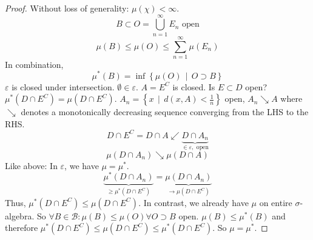 \documentclass[a4paper]{article}
\numberwithin{lecref}{section}
\theoremstyle{break}
\newcommand{\SetDef}[2]{\left\{#1\,\mid\,#2\right\}}
\begin{document}
\begin{proof}
  Without loss of generality: $\mu(\chi) < \infty$.
  \[ B \subset O = \bigcup_{n=1}^\infty E_n \text{ open} \]
  \[ \mu(B) \leq \mu(O) \leq \sum_{n=1}^\infty \mu(E_n) \]
  In combination,
  \[ \mu^*(B) = \inf\SetDef{\mu(O)}{O \supset B} \]
  $\varepsilon$ is closed under intersection. $\emptyset \in \varepsilon$.
  $A = E^C$ is closed. Is $E \subset D$ open? $\mu^*(D \cap E^C) = \mu(D \cap E^C)$.
  $A_n = \SetDef{x}{d(x, A) < \frac1n}$ open, $A_n \searrow A$
  where $\searrow$ denotes a monotonically decreasing sequence converging from the LHS to the RHS.
  \[ D \cap E^C = D \cap A \swarrow \underbrace{D \cap A_n}_{\in \varepsilon, \text{ open}} \]
  \[ \mu(D \cap A_n) \searrow \mu(D \cap A) \]
  Like above: In $\varepsilon$, we have $\mu = \mu^*$.
  \[ \underbrace{\mu^*(D \cap A_n)}_{\geq \mu^*(D \cap E^C)} = \underbrace{\mu(D \cap A_n)}_{\to \mu(D \cap E^C)} \]
  Thus, $\mu^*(D \cap E^C) \leq \mu(D \cap E^C)$.
  In contrast, we already have $\mu$ on entire $\sigma$-algebra. So $\forall B \in \mathcal B: \mu(B) \leq \mu(O) \forall O \supset B$ open. $\mu(B) \leq \mu^*(B)$ and therefore $\mu^*(D \cap E^C) \leq \mu(D \cap E^C) \leq \mu^*(D \cap E^C)$.
  So $\mu = \mu^*$.
\end{proof}

\printindex
\end{document}
